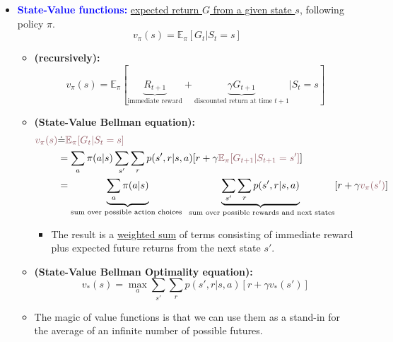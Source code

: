 \documentclass[12pt, a4paper]{article}
\begin{document}
\begin{itemize}
  \item \textcolor{blue}{\textbf{State-Value functions:}} \uline{expected return $G$ from a given state $s$}, following policy $\pi$.
  $$
  v_\pi (s) = \mathbb{E}_\pi[G_t|S_t=s]
  $$
  \begin{itemize}
  \item \textbf{(recursively):}
    $$
    v_\pi(s) = \mathbb{E}_\pi[\underbrace{R_{t+1}}_\text{immediate reward} + \underbrace{\gamma G_{t+1}}_\text{discounted return at time $t + 1$}|S_t=s]
    $$
  \item \textbf{(State-Value Bellman equation):}
    \begin{align*}
    \textcolor[HTML]{8F5760}{v_\pi(s)} &\dot{=} \textcolor[HTML]{8F5760}{\mathbb{E}_\pi[G_t|S_t=s]} \\
    &= \sum_a \pi(a|s) \sum_{s'} \sum_{r} p(s',r|s,a) [r + \gamma \textcolor[HTML]{8F5760}{\mathbb{E}_\pi[G_{t+1}|S_{t+1}=s']}] \\
    &= \underbrace{\sum_a \pi(a|s)}_\text{sum over possible action choices } \underbrace{\sum_{s'} \sum_{r} p(s',r|s,a)}_\text{ sum over possible rewards and next states} [r + \gamma \textcolor[HTML]{8F5760}{v_\pi(s')}]
    \end{align*}
    \begin{itemize}
      \item The result is a \uline{weighted sum} of terms consisting of immediate reward plus expected future returns from the next state $s'$.
    \end{itemize}

    \item \textbf{(State-Value Bellman Optimality equation):}
      $$
      v_*(s) = \max_a \sum_{s'} \sum_{r} p(s',r|s,a) [r + \gamma v_*(s')]
      $$

  \item The magic of value functions is that we can use them as a stand-in for the average of an infinite number of possible futures.
  \end{itemize}
\end{itemize}
\end{document}
